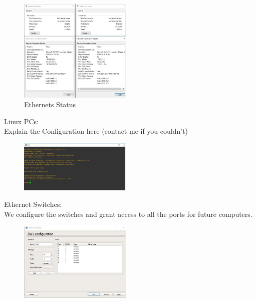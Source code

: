 \documentclass{article}
\begin{document}
\begin{figure}[H]
	\begin{center}
		\includegraphics[width=0.48\textwidth]{Ethernet.jpg}
	\end{center}
	\caption{\small Ethernets Status \newline}
	\label{fig:StatusEth}
\end{figure}


Linux PCs:\\
Explain the Configuration here (contact me if you couldn’t)

\begin{figure}[H]
	\begin{center}
		\includegraphics[width=0.48\textwidth]{VPC.jpg}
	\end{center}
	\caption{\small  \newline}
	\label{fig:VPC}
\end{figure}

Ethernet Switches:\\
We configure the switches and grant access to all the ports for future computers.

\begin{figure}[H]
	\begin{center}
		\includegraphics[width=0.48\textwidth]{Switchconf.jpg}
	\end{center}
	\caption{\small  \newline}
	\label{fig:Prd}
\end{figure}
\end{document}
